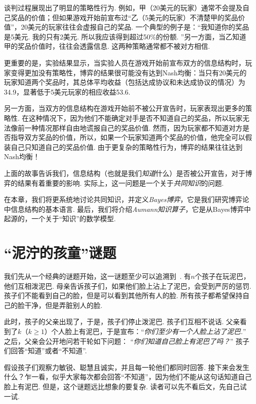 谈判过程展现出了明显的策略性行为. 例如，甲（20美元的玩家）通常不会提及自己奖品的价值；但如果游戏开始前宣布过“乙（5美元的玩家）不清楚甲的奖品价值”，20美元的玩家往往会虚报自己的奖品. 一个典型的例子是：“我知道你的奖品是5美元. 我的只有2美元. 所以我应该得到超过50\%的份额. ”另一方面，当乙知道甲的奖品价值时，往往会透露信息. 这两种策略通常都不被对方相信. 

更重要的是，实验结果显示，当实验人员在游戏开始前宣布双方的信息结构时，玩家变得更加没有策略性，博弈的结果很可能没有达到Nash均衡：当只有20美元的玩家知道两个奖品时，其总体平均收益（包括达成协议和未达成协议的情况）为34.9，显著低于5美元玩家的相应收益53.6. 

另一方面，当双方的信息结构在游戏开始前不被公开宣告时，玩家表现出更多的策略性. 在这种情况下，因为他们不能确定对手是否不知道自己的奖品，所以玩家无法像前一种情况那样自由地谎报自己的奖品价值. 然而，因为玩家都不知道对方是否指导双方奖品的价值，所以，如果一个玩家知道两个奖品的价值，他完全可以假装自己只知道自己的奖品价值. 由于更复杂的策略性行为，博弈的结果往往达到Nash均衡！

上面的故事告诉我们，信息结构（也就是我们\textit{知道}什么）是否被公开宣告，对于博弈的结果有着重要的影响. 实际上，这一问题是一个关于\textit{共同知识}的问题. 

在本章，我们将更系统地讨论共同知识，并定义\textit{Bayes博弈}，它是我们研究博弈论中信息结构的基本语言. 最后，我们将介绍\textit{Aumann知识算子}，它是从Bayes博弈中起源的，一个关于“知识”的数学模型. 


\section{“泥泞的孩童”谜题}

我们先从一个经典的谜题开始，这一谜题至少可以追溯到~\cite{gamowPuzzlemath1958}. 有$n$个孩子在玩泥巴，他们互相泼泥巴. 母亲告诉孩子们，如果他们脸上沾上了泥巴，会受到严厉的惩罚. 孩子们不能看到自己的脸，但是可以看到其他所有人的脸. 所有孩子都希望保持自己的脸干净，但是弄脏别人的脸. 

此时，孩子的父亲出现了，于是，孩子们停止泼泥巴. 孩子们互相不说话. 父亲看到了$k$（$k\geq 1$）个人脸上有泥巴，于是宣布：“\textit{你们至少有一个人脸上沾了泥巴.}” 之后，父亲会公开地问若干轮如下问题： “\textit{你们知道自己脸上有泥巴了吗？}” 孩子们回答“知道”或者“不知道”. 

假设孩子们观察力敏锐、聪慧且诚实，并且每一轮他们都同时回答. 接下来会发生什么？乍一看，似乎大家每次都会回答“不知道”，因为他们不能从这句话知道自己脸上有泥巴. 但是，这个谜题远比想象的要复杂. 读者可以先不看后文，先自己试一试. 

